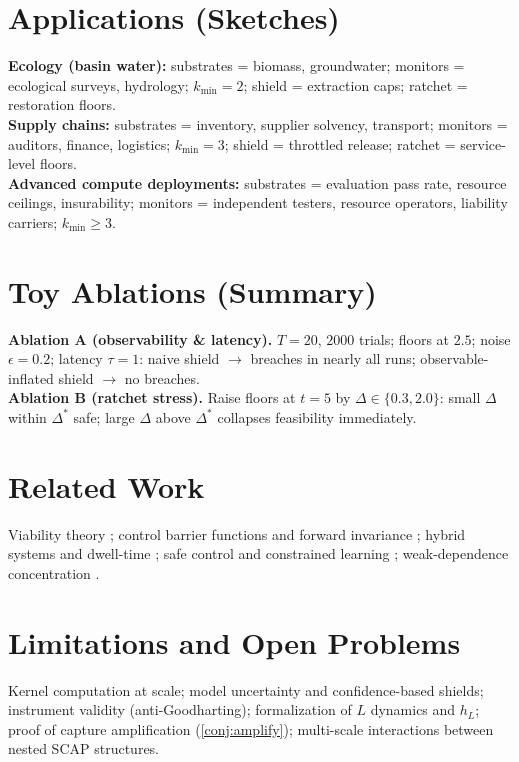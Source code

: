 \documentclass[11pt]{article}
\theoremstyle{definition}
\begin{document}
\section{Applications (Sketches)}
\textbf{Ecology (basin water):} substrates = biomass, groundwater; monitors = ecological surveys, hydrology; $k_{\min}\!=\!2$; shield = extraction caps; ratchet = restoration floors.\\
\textbf{Supply chains:} substrates = inventory, supplier solvency, transport; monitors = auditors, finance, logistics; $k_{\min}\!=\!3$; shield = throttled release; ratchet = service-level floors.\\
\textbf{Advanced compute deployments:} substrates = evaluation pass rate, resource ceilings, insurability; monitors = independent testers, resource operators, liability carriers; $k_{\min}\!\ge\!3$.

\section{Toy Ablations (Summary)}
\textbf{Ablation A (observability \& latency).} $T{=}20$, $2000$ trials; floors at $2.5$; noise $\epsilon=0.2$; latency $\tau=1$: naive shield $\to$ breaches in nearly all runs; observable-inflated shield $\to$ no breaches.\\
\textbf{Ablation B (ratchet stress).} Raise floors at $t{=}5$ by $\Delta\in\{0.3,2.0\}$: small $\Delta$ within $\Delta^\ast$ safe; large $\Delta$ above $\Delta^\ast$ collapses feasibility immediately.

\section{Related Work}
Viability theory \cite{Aubin}; control barrier functions and forward invariance \cite{Ames2016}; hybrid systems and dwell-time \cite{Branicky1998,Liberzon2003}; safe control and constrained learning \cite{Achiam2017,Berkenkamp2017}; weak-dependence concentration \cite{Janson2004}.

\section{Limitations and Open Problems}
Kernel computation at scale; model uncertainty and confidence-based shields; instrument validity (anti-Goodharting); formalization of $L$ dynamics and $h_L$; proof of capture amplification (\cref{conj:amplify}); multi-scale interactions between nested SCAP structures.
\end{document}

